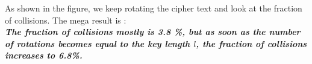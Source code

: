 \documentclass{llncs}
\begin{document}
As shown in the figure, we keep rotating the cipher text and look at the fraction of collisions. The mega result is : \\

\textbf{\textit{The fraction of collisions mostly is 3.8 \%, but as soon as the number of rotations becomes equal to the key length $l$, the fraction of collisions increases to 6.8\%.}} 
\end{document}
